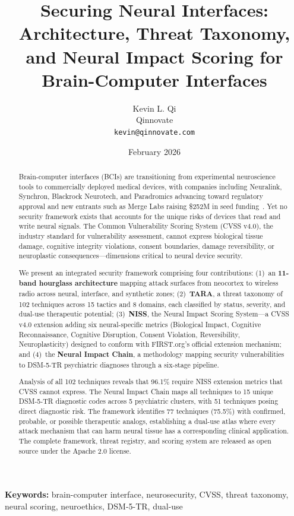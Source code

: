 \documentclass[11pt,a4paper]{article}
\title{Securing Neural Interfaces: Architecture, Threat Taxonomy, and Neural Impact Scoring for Brain-Computer Interfaces}
\author{
  Kevin L. Qi\\
  Qinnovate\\
  \texttt{kevin@qinnovate.com}
}
\date{February 2026}
\begin{document}
\maketitle

\begin{abstract}
Brain-computer interfaces (BCIs) are transitioning from experimental neuroscience tools to
commercially deployed medical devices, with companies including Neuralink, Synchron,
Blackrock Neurotech, and Paradromics advancing toward regulatory approval and new
entrants such as Merge Labs raising \$252M in seed funding~\cite{mergelabs2026}. Yet no security
framework exists that accounts for the unique risks of devices that read and write neural
signals. The Common Vulnerability Scoring System (CVSS v4.0), the industry standard for
vulnerability assessment, cannot express biological tissue damage, cognitive integrity
violations, consent boundaries, damage reversibility, or neuroplastic consequences---dimensions
critical to neural device security.

We present an integrated security framework comprising four contributions:
(1)~an \textbf{11-band hourglass architecture} mapping attack surfaces from neocortex to
wireless radio across neural, interface, and synthetic zones;
(2)~\textbf{TARA}, a threat taxonomy of 102 techniques across 15 tactics and 8 domains, each
classified by status, severity, and dual-use therapeutic potential;
(3)~\textbf{NISS}, the Neural Impact Scoring System---a CVSS v4.0 extension adding six
neural-specific metrics (Biological Impact, Cognitive Reconnaissance, Cognitive Disruption, Consent Violation,
Reversibility, Neuroplasticity) designed to conform with FIRST.org's official extension mechanism; and
(4)~the \textbf{Neural Impact Chain}, a methodology mapping security vulnerabilities to
DSM-5-TR psychiatric diagnoses through a six-stage pipeline.

Analysis of all 102 techniques reveals that 96.1\% require NISS extension metrics that CVSS
cannot express. The Neural Impact Chain maps all techniques to 15 unique DSM-5-TR diagnostic
codes across 5 psychiatric clusters, with 51 techniques posing direct diagnostic risk. The
framework identifies 77 techniques (75.5\%) with confirmed, probable, or possible therapeutic analogs,
establishing a dual-use atlas where every attack mechanism that can harm neural tissue has a
corresponding clinical application. The complete framework, threat registry, and scoring
system are released as open source under the Apache 2.0 license.
\end{abstract}

\noindent\textbf{Keywords:} brain-computer interface, neurosecurity, CVSS, threat taxonomy,
neural scoring, neuroethics, DSM-5-TR, dual-use

\tableofcontents
\newpage














\end{document}
